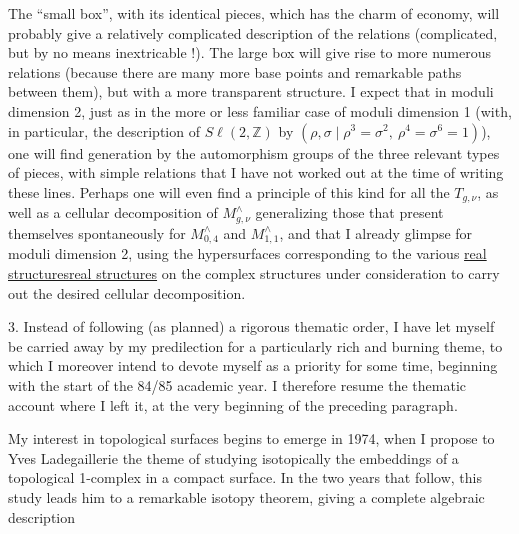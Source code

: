 \documentclass[11pt,a4paper]{article}
\let\TextUline\uline
\renewcommand{\uline}[1]{\ifmmode\underline{#1}\else\TextUline{#1}\fi}
\begin{document}
The ``small box'', with its identical pieces, which has
the charm of economy, will probably give a relatively
complicated description of the relations (complicated, but by no means
inextricable !). The large box will give rise to more numerous
relations (because there are many more base points and
remarkable paths between them), but with a more transparent structure. I
expect that in moduli dimension 2, just as in the more or
less familiar case of moduli dimension 1 (with, in particular, the
description of $S\ell(2,\mathbb{Z})$ by $(\rho,\sigma \mid \rho^3 = \sigma^2,\ \rho^4 = \sigma^6 = 1)$), one will find
generation by the automorphism groups of the three relevant types
of pieces, with simple relations that I have not worked out
at the time of writing these lines. Perhaps one will even find a
principle of this kind for all the $T_{g,\nu}$, as well as a cellular
decomposition of $M^{\wedge}_{g,\nu}$ generalizing those that present themselves spontaneously
for $M^{\wedge}_{0,4}$ and $M^{\wedge}_{1,1}$, and that I already glimpse for
moduli dimension 2, using the hypersurfaces corresponding
to the various \uline{real structures} on the complex structures
under consideration to carry out the desired cellular decomposition.


3. Instead of following (as planned) a rigorous thematic
order, I have let myself be carried away by my predilection for a
particularly rich and burning theme, to which I moreover intend to
devote myself as a priority for some time, beginning with the start
of the 84/85 academic year. I therefore resume the thematic account where I left it,
at the very beginning of the preceding paragraph.

My interest in topological surfaces begins to emerge
in 1974, when I propose to Yves Ladegaillerie the theme of studying
isotopically the embeddings of a topological 1-complex in a compact
surface. In the two years that follow, this study leads him to
a remarkable isotopy theorem, giving a complete algebraic description
\end{document}
